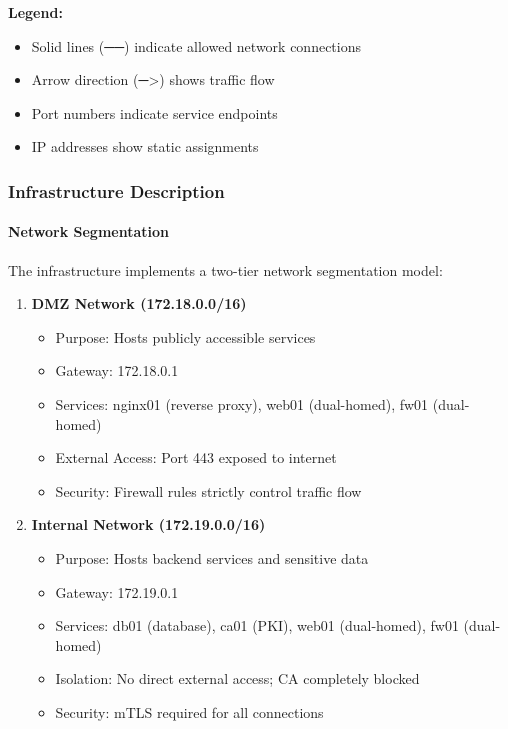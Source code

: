 \textbf{Legend:}
\begin{itemize}
    \item Solid lines (──) indicate allowed network connections
    \item Arrow direction (─>) shows traffic flow
    \item Port numbers indicate service endpoints
    \item IP addresses show static assignments
\end{itemize}

\subsubsection{Infrastructure Description}

\paragraph{Network Segmentation}

The infrastructure implements a two-tier network segmentation model:

\begin{enumerate}
    \item \textbf{DMZ Network (172.18.0.0/16)}
    \begin{itemize}
        \item Purpose: Hosts publicly accessible services
        \item Gateway: 172.18.0.1
        \item Services: nginx01 (reverse proxy), web01 (dual-homed), fw01 (dual-homed)
        \item External Access: Port 443 exposed to internet
        \item Security: Firewall rules strictly control traffic flow
    \end{itemize}
    
    \item \textbf{Internal Network (172.19.0.0/16)}
    \begin{itemize}
        \item Purpose: Hosts backend services and sensitive data
        \item Gateway: 172.19.0.1
        \item Services: db01 (database), ca01 (PKI), web01 (dual-homed), fw01 (dual-homed)
        \item Isolation: No direct external access; CA completely blocked
        \item Security: mTLS required for all connections
    \end{itemize}
\end{enumerate}

